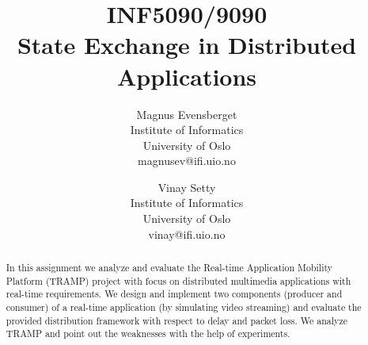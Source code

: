 \documentclass[12pt, conference, compsocconf, letterpaper]{IEEEtran}
\begin{document}
\title{INF5090/9090\\State Exchange in Distributed Applications}

%
%
%
%
%

%
\author{
	Magnus Evensberget\\
	Institute of Informatics\\
	University of Oslo\\
	magnusev@ifi.uio.no
\and
	Vinay Setty\\
	Institute of Informatics\\
	University of Oslo\\
	vinay@ifi.uio.no
}

\maketitle
\begin{abstract}
In this assignment we analyze and evaluate the Real-time Application Mobility Platform (TRAMP) project with focus on distributed multimedia applications with real-time requirements. 
We design and implement two components (producer and consumer) of a real-time application (by simulating video streaming) and evaluate the provided distribution framework with respect to delay and packet loss. We analyze TRAMP and point out the weaknesses with the help of experiments. 
\end{abstract}
\end{document}
